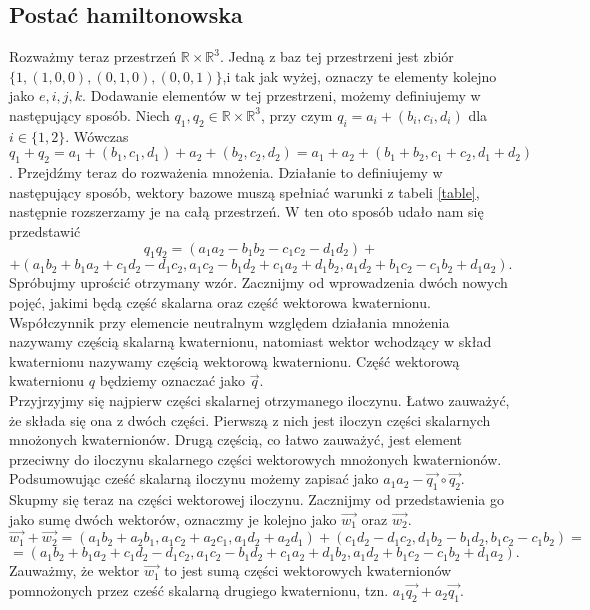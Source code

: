 \documentclass[a4paper,twoside,11pt,reqno]{mwrep}
\theoremstyle{plain} \newtheorem{twr}{Twierdzenie}
\theoremstyle{plain} \newtheorem{lem}{Lemat}
\theoremstyle{definition} \newtheorem{defi}{Definicja}
\theoremstyle{remark} \newtheorem*{wni}{Wniosek}
\theoremstyle{definition} \newtheorem{uwaga}{Uwaga}
\theoremstyle{definition}\newtheorem{prz}{Przykład}
\begin{document}
\subsection{Postać hamiltonowska}
Rozważmy teraz przestrzeń $\mathbb{R}\times \mathbb{R}^3$. Jedną z baz
tej przestrzeni jest zbiór\\
$\{ 1,(1,0,0),(0,1,0),(0,0,1) \}$,i tak jak wyżej, oznaczy te elementy kolejno
jako $e,i,j,k$. Dodawanie elementów w tej przestrzeni, możemy definiujemy w następujący sposób.
Niech $q_1,q_2\in\mathbb{R}\times \mathbb{R}^3$, przy czym  $q_i =a_i +(b_i,c_i,d_i)$ 
dla $i\in \{ 1,2\}$. Wówczas
$$q_1+q_2=a_1 +(b_1,c_1,d_1) + a_2 +(b_2,c_2,d_2) = a_1+a_2 +(b_1+b_2,c_1+c_2,d_1+d_2)$$.
Przejdźmy teraz do rozważenia mnożenia. Działanie to definiujemy w następujący sposób,
wektory bazowe muszą spełniać warunki z tabeli \ref{table}, następnie rozszerzamy
je na całą przestrzeń. W ten oto sposób udało nam się przedstawić 
$$q_1q_2= (a_1 a_2-b_1b_2-c_1c_2-d_1d_2)+$$
$$+(a_1b_2+b_1a_2+c_1d_2-d_1c_2,a_1c_2-b_1d_2+c_1a_2+d_1b_2,a_1d_2+b_1c_2-c_1b_2+d_1a_2).$$
Spróbujmy uprościć otrzymany wzór. Zacznijmy od wprowadzenia dwóch nowych pojęć, jakimi będą
część skalarna oraz część wektorowa kwaternionu. 
Współczynnik przy elemencie neutralnym względem działania mnożenia nazywamy częścią skalarną kwaternionu,
natomiast wektor wchodzący w skład kwaternionu nazywamy częścią wektorową kwaternionu.
Część wektorową kwaternionu $q$ będziemy oznaczać jako $\overrightarrow{q}$.\\ %
\indent
Przyjrzyjmy się najpierw części skalarnej otrzymanego iloczynu. Łatwo zauważyć, 
że składa się ona z dwóch części. Pierwszą z nich jest iloczyn części skalarnych
mnożonych kwaternionów. Drugą częścią, co łatwo zauważyć, jest element przeciwny do iloczynu skalarnego części wektorowych mnożonych kwaternionów. 
Podsumowując cześć skalarną iloczynu możemy zapisać jako 
$a_1a_2 - \overrightarrow{q_1}\circ\overrightarrow{q_2}$.\\
\indent
Skupmy się teraz na części wektorowej iloczynu. Zacznijmy od przedstawienia go jako sumę 
dwóch wektorów, oznaczmy je kolejno jako $\overrightarrow{w_1}$ oraz $\overrightarrow{w_2}$.
$$\overrightarrow{w_1}+\overrightarrow{w_2}=(a_1b_2 +a_2b_1 ,a_1c_2+a_2c_1,a_1d_2+a_2d_1) + 
(c_1d_2-d_1c_2,
d_1b_2-b_1d_2,
b_1c_2-c_1b_2)= $$
$$=(a_1b_2+b_1a_2+c_1d_2-d_1c_2,
a_1c_2-b_1d_2+c_1a_2+d_1b_2,
a_1d_2+b_1c_2-c_1b_2+d_1a_2).$$ 
Zauważmy, że wektor $\overrightarrow{w_1}$ to jest sumą części wektorowych kwaternionów
pomnożonych przez cześć skalarną drugiego kwaternionu, tzn. 
$a_1\overrightarrow{q_2}+a_2\overrightarrow{q_1}$.\\
\end{document}
